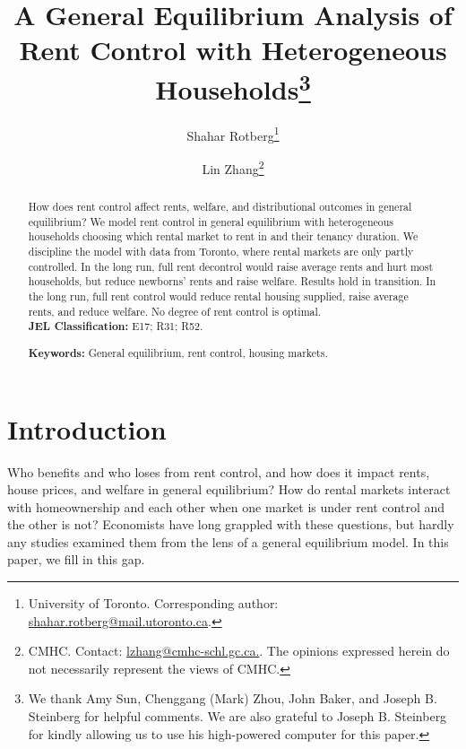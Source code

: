 \documentclass[parskip=full]{article}
\author{Shahar Rotberg\footnote{University of Toronto. Corresponding author: \url{shahar.rotberg@mail.utoronto.ca}.} \and Lin Zhang\footnote{CMHC. Contact: \url{lzhang@cmhc-schl.gc.ca.}. The opinions expressed herein do not necessarily represent the views of CMHC.}}
\title{\vspace{-1.8cm}A General Equilibrium Analysis of Rent Control with Heterogeneous Households\footnote{We thank Amy Sun, Chenggang (Mark) Zhou, John Baker, and Joseph B. Steinberg for helpful comments. We are also grateful to Joseph B. Steinberg for kindly allowing us to use his high-powered computer for this paper.}}
\begin{document}
\maketitle

\begin{abstract}
\onehalfspacing
\noindent How does rent control affect rents, welfare, and distributional outcomes in general equilibrium? We model rent control in general equilibrium with heterogeneous households choosing which rental market to rent in and their tenancy duration. We discipline the model with data from Toronto, where rental markets are only partly controlled. In the long run, full rent decontrol would raise average rents and hurt most households, but reduce newborns' rents and raise welfare. Results hold in transition. In the long run, full rent control would reduce rental housing supplied, raise average rents, and reduce welfare. No degree of rent control is optimal.
\\[1.5ex]

\noindent \textbf{JEL Classification:} E17; R31; R52. 

\noindent \textbf{Keywords:} General equilibrium, rent control, housing markets.
\end{abstract}

\section{Introduction}

Who benefits and who loses from rent control, and how does it impact rents, house prices, and welfare in general equilibrium? How do rental markets interact with homeownership and each other when one market is under rent control and the other is not? Economists have long grappled with these questions, but hardly any studies examined them from the lens of a general equilibrium model. In this paper, we fill in this gap.
\end{document}
